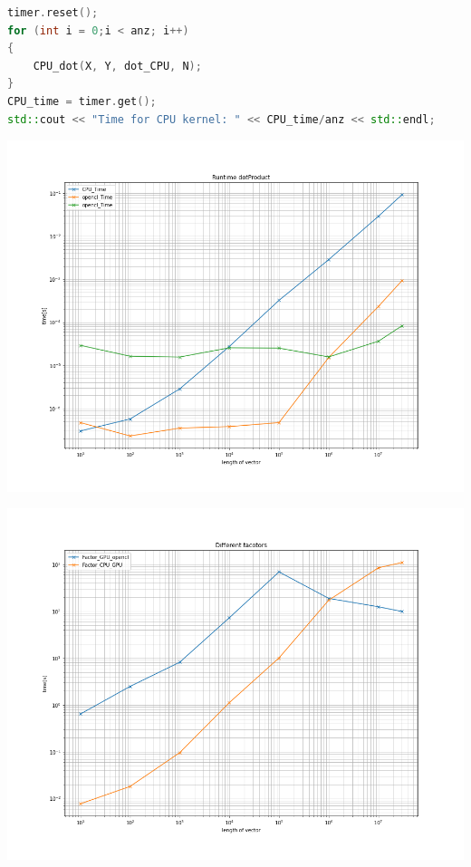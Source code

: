 \documentclass[11pt,a4paper]{article}
\begin{document}
\begin{lstlisting}[language=C++, caption={CPU benchmark}]
timer.reset();
for (int i = 0;i < anz; i++)
{
	CPU_dot(X, Y, dot_CPU, N);
}
CPU_time = timer.get();
std::cout << "Time for CPU kernel: " << CPU_time/anz << std::endl;
\end{lstlisting}
\begin{center}
\begin{minipage}[t]{0.49\textwidth}
	\includegraphics[width=\textwidth]{Bilder/Runtime_dotProduct}
\end{minipage}
\begin{minipage}[t]{0.49\textwidth}
	\includegraphics[width=\textwidth]{Bilder/diff_factor}
\end{minipage}	
\end{center}

	
\end{document}
